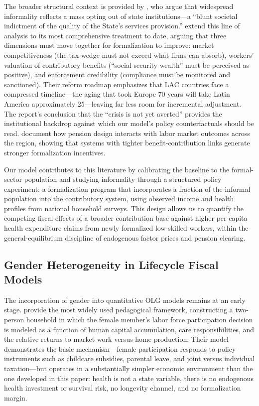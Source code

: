 \documentclass[12pt,a4paper]{article}
\begin{document}
The broader structural context is provided by \citet{PerryEtAl2007}, who argue that widespread informality reflects a mass opting out of state institutions---a ``blunt societal indictment of the quality of the State's services provision.'' \citet{WorldBankInformalizing2025} extend this line of analysis to its most comprehensive treatment to date, arguing that three dimensions must move together for formalization to improve: market competitiveness (the tax wedge must not exceed what firms can absorb), workers' valuation of contributory benefits (``social security wealth'' must be perceived as positive), and enforcement credibility (compliance must be monitored and sanctioned). Their reform roadmap emphasizes that LAC countries face a compressed timeline---the aging that took Europe 70 years will take Latin America approximately 25---leaving far less room for incremental adjustment. The report's conclusion that the ``crisis is not yet averted'' provides the institutional backdrop against which our model's policy counterfactuals should be read. \citet{BoschMelguizoPages2013} document how pension design interacts with labor market outcomes across the region, showing that systems with tighter benefit-contribution links generate stronger formalization incentives.

Our model contributes to this literature by calibrating the baseline to the formal-sector population and studying informality through a structured policy experiment: a formalization program that incorporates a fraction of the informal population into the contributory system, using observed income and health profiles from national household surveys. This design allows us to quantify the competing fiscal effects of a broader contribution base against higher per-capita health expenditure claims from newly formalized low-skilled workers, within the general-equilibrium discipline of endogenous factor prices and pension clearing.

\subsection{Gender Heterogeneity in Lifecycle Fiscal Models}
\label{subsec:lit_gender}

The incorporation of gender into quantitative OLG models remains at an early stage. \citet{FehrKindermann2018} provide the most widely used pedagogical framework, constructing a two-person household in which the female member's labor force participation decision is modeled as a function of human capital accumulation, care responsibilities, and the relative returns to market work versus home production. Their model demonstrates the basic mechanism---female participation responds to policy instruments such as childcare subsidies, parental leave, and joint versus individual taxation---but operates in a substantially simpler economic environment than the one developed in this paper: health is not a state variable, there is no endogenous health investment or survival risk, no longevity channel, and no formalization margin.
\end{document}
